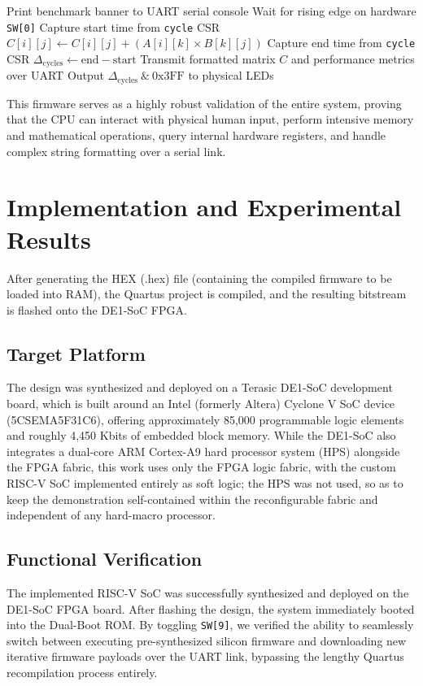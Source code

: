 \documentclass[runningheads]{llncs}
\begin{document}
\begin{algorithm}[htbp]
\caption{Matrix Multiplication Benchmark with Cycle Counting}
\begin{algorithmic}[1]
\State Print benchmark banner to UART serial console
\State Wait for rising edge on hardware \texttt{SW[0]}
\State Capture start time from \texttt{cycle} CSR
            \State $C[i][j] \gets C[i][j] + (A[i][k] \times B[k][j])$
        \EndFor
    \EndFor
\EndFor
\State Capture end time from \texttt{cycle} CSR
\State $\Delta_{\text{cycles}} \gets \text{end} - \text{start}$
\State Transmit formatted matrix $C$ and performance metrics over UART
\State Output $\Delta_{\text{cycles}} \ \& \ \text{0x3FF}$ to physical LEDs
\end{algorithmic}
\end{algorithm}

This firmware serves as a highly robust validation of the entire system, proving that the CPU can interact with physical human input, perform intensive memory and mathematical operations, query internal hardware registers, and handle complex string formatting over a serial link.

\section{Implementation and Experimental Results}\label{sec5}
After generating the HEX (.hex) file (containing the compiled firmware to be loaded into RAM), the Quartus project is compiled, and the resulting bitstream is flashed onto the DE1-SoC FPGA.

\subsection{Target Platform}
The design was synthesized and deployed on a Terasic DE1-SoC development board, which is built around an Intel (formerly Altera) Cyclone V SoC device (5CSEMA5F31C6), offering approximately 85,000 programmable logic elements and roughly 4,450 Kbits of embedded block memory. While the DE1-SoC also integrates a dual-core ARM Cortex-A9 hard processor system (HPS) alongside the FPGA fabric, this work uses only the FPGA logic fabric, with the custom RISC-V SoC implemented entirely as soft logic; the HPS was not used, so as to keep the demonstration self-contained within the reconfigurable fabric and independent of any hard-macro processor.

\subsection{Functional Verification}
The implemented RISC-V SoC was successfully synthesized and deployed on the DE1-SoC FPGA board. After flashing the design, the system immediately booted into the Dual-Boot ROM. By toggling \texttt{SW[9]}, we verified the ability to seamlessly switch between executing pre-synthesized silicon firmware and downloading new iterative firmware payloads over the UART link, bypassing the lengthy Quartus recompilation process entirely.
\end{document}
